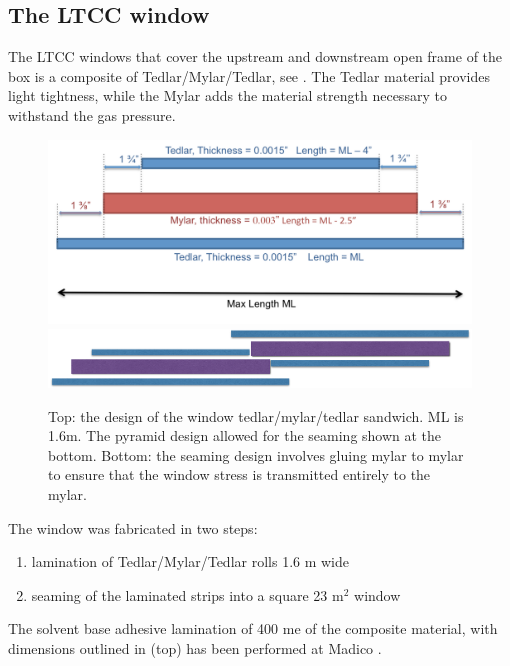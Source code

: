 \subsection{The LTCC window}

The LTCC windows that cover the upstream and downstream open frame of the box is a composite of Tedlar/Mylar/Tedlar, see . The Tedlar
material provides light tightness, while the Mylar adds the material strength necessary to withstand the gas pressure.

\begin{figure}
	\centering
	\includegraphics[width=1.0\columnwidth,keepaspectratio]{img/windowDesign.png}
	\includegraphics[width=1.0\columnwidth,keepaspectratio]{img/windowSeaming.png}
\caption{Top: the design of the window tedlar/mylar/tedlar sandwich. ML is 1.6m. The pyramid design allowed for the seaming shown at the bottom.
			Bottom: the seaming design involves gluing mylar to mylar to ensure that the window stress is transmitted entirely to the mylar. }
	\label{fig:windowDesign}
\end{figure}


The window was fabricated in two steps:

\begin{enumerate}
	\item lamination of Tedlar/Mylar/Tedlar rolls 1.6 m  wide
	\item seaming of the laminated strips into a square 23 m$^2$ window
\end{enumerate}

The solvent base adhesive lamination of 400 me of the composite material, with dimensions outlined in  (top) has been performed
at Madico \cite{madico}.


